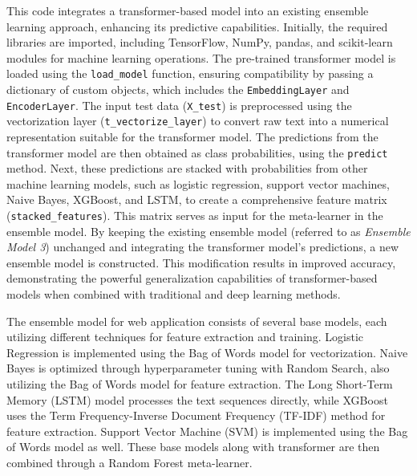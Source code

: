 \noindent
This code integrates a transformer-based model into an existing ensemble learning approach, enhancing its predictive capabilities. Initially, the required libraries are imported, including TensorFlow, NumPy, pandas, and scikit-learn modules for machine learning operations. The pre-trained transformer model is loaded using the \texttt{load\_model} function, ensuring compatibility by passing a dictionary of custom objects, which includes the \texttt{EmbeddingLayer} and \texttt{EncoderLayer}. The input test data (\texttt{X\_test}) is preprocessed using the vectorization layer (\texttt{t\_vectorize\_layer}) to convert raw text into a numerical representation suitable for the transformer model. The predictions from the transformer model are then obtained as class probabilities, using the \texttt{predict} method. Next, these predictions are stacked with probabilities from other machine learning models, such as logistic regression, support vector machines, Naive Bayes, XGBoost, and LSTM, to create a comprehensive feature matrix (\texttt{stacked\_features}). This matrix serves as input for the meta-learner in the ensemble model. By keeping the existing ensemble model (referred to as \textit{Ensemble Model 3}) unchanged and integrating the transformer model's predictions, a new ensemble model is constructed. This modification results in improved accuracy, demonstrating the powerful generalization capabilities of transformer-based models when combined with traditional and deep learning methods.

\vspace{1em}

\noindent
The ensemble model for web application consists of several base models, each utilizing different techniques for feature extraction and training. Logistic Regression is implemented using the Bag of Words model for vectorization. Naive Bayes is optimized through hyperparameter tuning with Random Search, also utilizing the Bag of Words model for feature extraction. The Long Short-Term Memory (LSTM) model processes the text sequences directly, while XGBoost uses the Term Frequency-Inverse Document Frequency (TF-IDF) method for feature extraction. Support Vector Machine (SVM) is implemented using the Bag of Words model as well. These base models along with transformer are then combined through a Random Forest meta-learner.


\pagebreak

